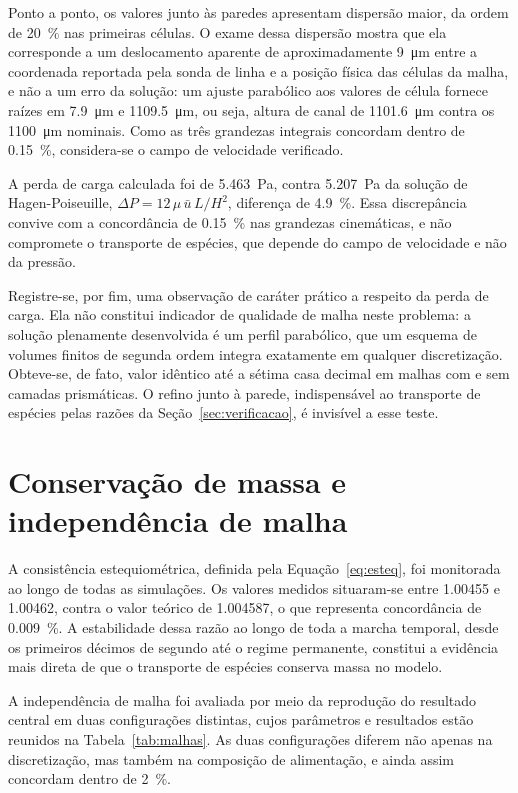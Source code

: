 Ponto a ponto, os valores junto às paredes apresentam dispersão maior, da ordem
de \SI{20}{\percent} nas primeiras células. O exame dessa dispersão mostra que
ela corresponde a um deslocamento aparente de aproximadamente
\SI{9}{\micro\meter} entre a coordenada reportada pela sonda de linha e a
posição física das células da malha, e não a um erro da solução: um ajuste
parabólico aos valores de célula fornece raízes em \SI{7.9}{\micro\meter} e
\SI{1109.5}{\micro\meter}, ou seja, altura de canal de
\SI{1101.6}{\micro\meter} contra os \SI{1100}{\micro\meter} nominais. Como as
três grandezas integrais concordam dentro de \SI{0.15}{\percent}, considera-se
o campo de velocidade verificado.

A perda de carga calculada foi de \SI{5.463}{\pascal}, contra
\SI{5.207}{\pascal} da solução de Hagen-Poiseuille,
$\Delta P = 12\,\mu\,\bar{u}\,L/H^2$, diferença de \SI{4.9}{\percent}. Essa
discrepância convive com a concordância de \SI{0.15}{\percent} nas grandezas
cinemáticas, e não compromete o transporte de espécies, que depende do campo de
velocidade e não da pressão.

Registre-se, por fim, uma observação de caráter prático a respeito da perda de
carga. Ela não constitui indicador de qualidade de malha neste problema: a
solução plenamente desenvolvida é um perfil parabólico, que um esquema de
volumes finitos de segunda ordem integra exatamente em qualquer discretização.
Obteve-se, de fato, valor idêntico até a sétima casa decimal em malhas com e sem
camadas prismáticas. O refino junto à parede, indispensável ao transporte de
espécies pelas razões da Seção~\ref{sec:verificacao}, é invisível a esse teste.

\section{Conservação de massa e independência de malha}

A consistência estequiométrica, definida pela Equação~\eqref{eq:esteq}, foi
monitorada ao longo de todas as simulações. Os valores medidos situaram-se entre
\num{1.00455} e \num{1.00462}, contra o valor teórico de \num{1.004587}, o que
representa concordância de \SI{0.009}{\percent}. A estabilidade dessa razão ao
longo de toda a marcha temporal, desde os primeiros décimos de segundo até o
regime permanente, constitui a evidência mais direta de que o transporte de
espécies conserva massa no modelo.

A independência de malha foi avaliada por meio da reprodução do resultado
central em duas configurações distintas, cujos parâmetros e resultados estão
reunidos na Tabela~\ref{tab:malhas}. As duas configurações diferem não apenas na
discretização, mas também na composição de alimentação, e ainda assim
concordam dentro de \SI{2}{\percent}.

